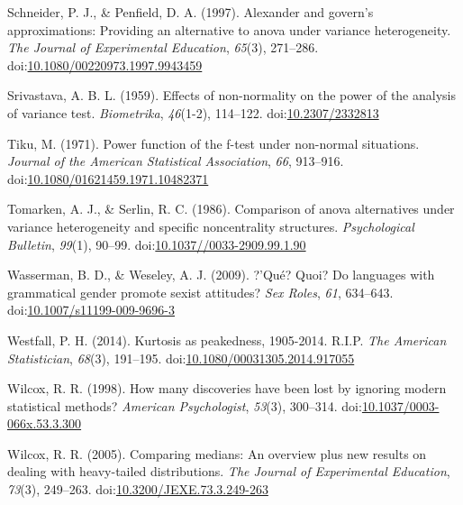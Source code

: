 \documentclass[man,floatsintext]{apa6}
\begin{document}
\leavevmode\hypertarget{ref-Schneider_and_Penfield_1997}{}%
Schneider, P. J., \& Penfield, D. A. (1997). Alexander and govern's approximations: Providing an alternative to anova under variance heterogeneity. \emph{The Journal of Experimental Education}, \emph{65}(3), 271--286. doi:\href{https://doi.org/10.1080/00220973.1997.9943459}{10.1080/00220973.1997.9943459}

\leavevmode\hypertarget{ref-Srivastava_1959}{}%
Srivastava, A. B. L. (1959). Effects of non-normality on the power of the analysis of variance test. \emph{Biometrika}, \emph{46}(1-2), 114--122. doi:\href{https://doi.org/10.2307/2332813}{10.2307/2332813}

\leavevmode\hypertarget{ref-Tiku_1971}{}%
Tiku, M. (1971). Power function of the f-test under non-normal situations. \emph{Journal of the American Statistical Association}, \emph{66}, 913--916. doi:\href{https://doi.org/10.1080/01621459.1971.10482371}{10.1080/01621459.1971.10482371}

\leavevmode\hypertarget{ref-Tomarken_and_Serlin_1986}{}%
Tomarken, A. J., \& Serlin, R. C. (1986). Comparison of anova alternatives under variance heterogeneity and specific noncentrality structures. \emph{Psychological Bulletin}, \emph{99}(1), 90--99. doi:\href{https://doi.org/10.1037//0033-2909.99.1.90}{10.1037//0033-2909.99.1.90}

\leavevmode\hypertarget{ref-Wasserman_and_Weseley_2009}{}%
Wasserman, B. D., \& Weseley, A. J. (2009). ?'Qué? Quoi? Do languages with grammatical gender promote sexist attitudes? \emph{Sex Roles}, \emph{61}, 634--643. doi:\href{https://doi.org/10.1007/s11199-009-9696-3}{10.1007/s11199-009-9696-3}

\leavevmode\hypertarget{ref-Westfall_2014}{}%
Westfall, P. H. (2014). Kurtosis as peakedness, 1905-2014. R.I.P. \emph{The American Statistician}, \emph{68}(3), 191--195. doi:\href{https://doi.org/10.1080/00031305.2014.917055}{10.1080/00031305.2014.917055}

\leavevmode\hypertarget{ref-Wilcox_1998}{}%
Wilcox, R. R. (1998). How many discoveries have been lost by ignoring modern statistical methods? \emph{American Psychologist}, \emph{53}(3), 300--314. doi:\href{https://doi.org/10.1037/0003-066x.53.3.300}{10.1037/0003-066x.53.3.300}

\leavevmode\hypertarget{ref-Wilcox_2005}{}%
Wilcox, R. R. (2005). Comparing medians: An overview plus new results on dealing with heavy-tailed distributions. \emph{The Journal of Experimental Education}, \emph{73}(3), 249--263. doi:\href{https://doi.org/10.3200/JEXE.73.3.249-263}{10.3200/JEXE.73.3.249-263}
\end{document}
